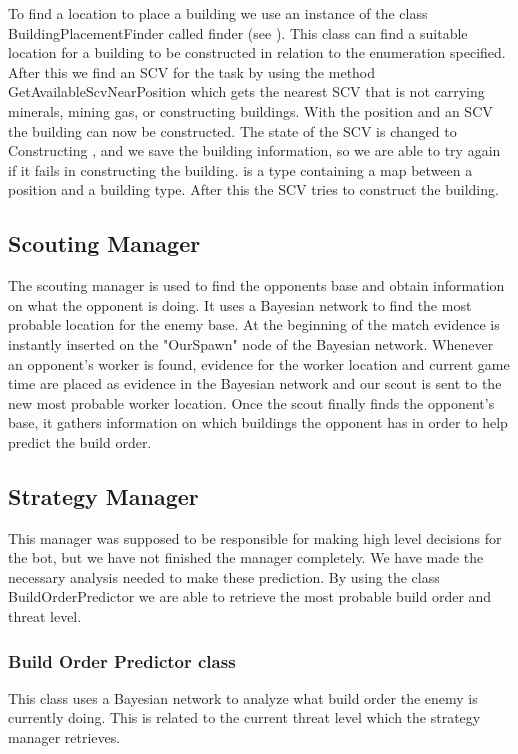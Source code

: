 			To find a location to place a building we use an instance of the class BuildingPlacementFinder called finder (see ).
			This class can find a suitable location for a building to be constructed in relation to the enumeration specified. After this we find an SCV for the 
			task  by using the method GetAvailableScvNearPosition which gets the nearest SCV that is not carrying minerals, mining gas, or 
			constructing buildings. With the position and an SCV the building can now be constructed. The state of the SCV is changed to Constructing , and 
			we save the building information, so we are able to try again if it fails in constructing the building.  is a type containing 
			a map between a position and a building type. After this the SCV tries to 
			construct the building.
	\subsection{Scouting Manager}
		The scouting manager is used to find the opponents base and obtain information on what the opponent is doing. 
		It uses a Bayesian network to find the most probable location for the enemy base.
		At the beginning of the match evidence is instantly inserted on the "OurSpawn" node of the Bayesian network.
		Whenever an opponent's worker is found, evidence for the worker location and current game time are placed as evidence in the 
		Bayesian network and our scout is sent to the new most probable worker location. 
		Once the scout finally finds the opponent's base, it gathers information on which 
		buildings the opponent has in order to help predict the build order.
	\subsection{Strategy Manager}
		This manager was supposed to be responsible for making high level decisions for the bot, but we have not finished the manager completely. We have made the necessary analysis needed to make these prediction. By using the class BuildOrderPredictor we are able to retrieve the most 
		probable build order and threat level.
		
		\subsubsection{Build Order Predictor class}
			This class uses a Bayesian network to analyze what build order the enemy is currently doing. This is related to the current threat level which
			the strategy manager retrieves. \\
			
